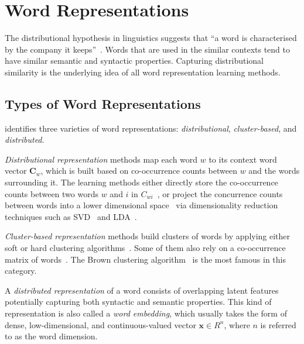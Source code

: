 \section{Word Representations}
\label{wordrep}
The distributional hypothesis in linguistics suggests that ``a word is characterised by the company it keeps''~\cite{firth1957}. Words that are used in the similar contexts tend to have similar semantic and syntactic properties. Capturing distributional similarity is the underlying idea of all word representation learning methods. 

\subsection{Types of Word Representations}
 identifies three varieties of word representations: \textit{distributional},  \textit{cluster-based}, and \textit{distributed}.

\textit{Distributional representation} methods map each word $w$ to its context word vector $\mathbf{C}_w$, which is built based on co-occurrence counts between $w$ and the words surrounding it. The learning methods either directly store the co-occurrence counts between two words $w$ and $i$ in $C_{wi}$~\cite{sahlgren2006word,turney2010frequency,honkela1997self}, or project the concurrence counts between words into a lower dimensional space~\cite{vrehuuvrek2010software,lund1996producing} via dimensionality reduction techniques such as SVD~\cite{dumais1988using} and LDA~\cite{blei2003latent}. 

\textit{Cluster-based representation} methods build clusters of words by applying either soft or hard clustering algorithms~\cite{lin2009phrase,li2005semi}. Some of them also rely on a co-occurrence matrix of words~\cite{pereira1993distributional}. The Brown clustering algorithm~\cite{Brown92class-basedn-gram} is the most famous in this category.

A \textit{distributed representation} of a word consists of overlapping latent features potentially capturing both syntactic and semantic properties. This kind of representation is also called a \emph{word embedding}, which usually takes the form of dense, low-dimensional, and continuous-valued vector $\mathbf{x} \in R^n$, where $n$ is referred to as the word dimension.

